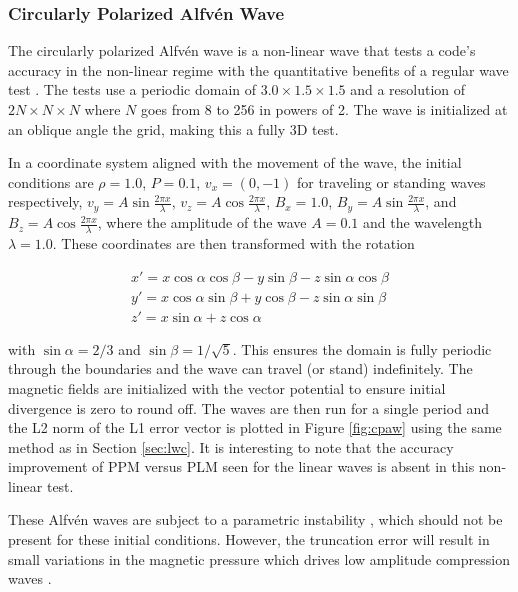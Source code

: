 \subsubsection{Circularly Polarized Alfv\'en Wave}
\label{sec:cpaw}

The circularly polarized Alfv\'en wave is a non-linear wave that tests a code's accuracy in the non-linear regime with the quantitative benefits of a regular wave test \citep{Toth1996}. The tests use a periodic domain of $3.0\times1.5\times1.5$ and a resolution of $2N\times N \times N$ where $N$ goes from 8 to 256 in powers of 2. The wave is initialized at an oblique angle the grid, making this a fully 3D test.

In a coordinate system aligned with the movement of the wave, the initial conditions are 
$\rho = 1.0$,
$P = 0.1$,
$v_x = (0,-1)$ for traveling or standing waves respectively,
$v_y = A \sin{\frac{2\pi x}{\lambda}}$,
$v_z = A \cos{\frac{2\pi x}{\lambda}}$,
$B_x = 1.0$,
$B_y = A \sin{\frac{2\pi x}{\lambda}}$,
and $B_z = A \cos{\frac{2\pi x}{\lambda}}$,
where the amplitude of the wave $A = 0.1$ and the wavelength $\lambda = 1.0$. These coordinates are then transformed with the rotation

\begin{eqnarray}
    x\prime = x \cos\alpha\cos\beta - y \sin\beta - z \sin\alpha\cos\beta \nonumber \\
    y\prime = x \cos\alpha\sin\beta + y \cos\beta - z \sin\alpha\sin\beta \nonumber \\
    z\prime = x \sin\alpha + z \cos\alpha \nonumber
\end{eqnarray}

\noindent with $\sin\alpha = 2/3$ and $\sin\beta = 1/\sqrt{5}$. This ensures the domain is fully periodic through the boundaries and the wave can travel (or stand) indefinitely. The magnetic fields are initialized with the vector potential to ensure initial divergence is zero to round off. The waves are then run for a single period and the L2 norm of the L1 error vector is plotted in Figure \ref{fig:cpaw} using the same method as in Section \ref{sec:lwc}. It is interesting to note that the accuracy improvement of PPM versus PLM seen for the linear waves is absent in this non-linear test.

These Alfv\'en waves are subject to a parametric instability \citep{del_zanna_parametric_2001}, which should not be present for these initial conditions. However, the truncation error will result in small variations in the magnetic pressure which drives low amplitude compression waves \citep{stone_athena_2008}. 

